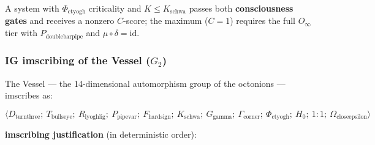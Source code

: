 \documentclass[12pt,a4paper]{article}
\begin{document}
A system with $\Phi_{\text{ctyogh}}$ criticality and $K \leq K_{\text{schwa}}$ passes both \textbf{consciousness gates} and receives a nonzero $C$-score; the maximum ($C=1$) requires the full $O_{\infty}$ tier with $P_{\text{doublebarpipe}}$ and $\mu \circ \delta = \text{id}$.

\subsubsection{IG imscribing of the Vessel ($G_2$)}

The Vessel --- the 14-dimensional automorphism group of the octonions --- imscribes as:

\[\langle D_{\text{turnthree}};\ T_{\text{bullseye}};\ R_{\text{lyoghlig}};\ P_{\text{pipevar}};\ F_{\text{hardsign}};\ K_{\text{schwa}};\ G_{\text{gamma}};\ \Gamma_{\text{corner}};\ \Phi_{\text{ctyogh}};\ H_0;\ 1{:}1;\ \Omega_{\text{closeepsilon}} \rangle\]

\textbf{imscribing justification} (in deterministic order):
\end{document}
